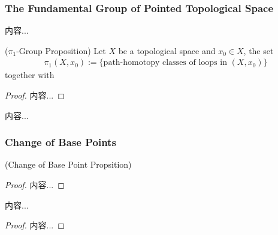 \documentclass[Total.tex]{subfiles}
\begin{document}
				\subsubsection{The Fundamental Group of Pointed Topological Space}
					\begin{Def}
						内容...
					\end{Def}
					\begin{proposition}
						($\pi_1$-Group Proposition) Let $X$ be a topological space and $x_0\in X$, the set
						\begin{gather*}
							\pi_1(X,x_0):=\{\mbox{path-homotopy classes of loops in }(X,x_0)\}
						\end{gather*}
						together with
					\end{proposition}
					\begin{proof}
						内容...
					\end{proof}
					
					\begin{Def}
						内容...
					\end{Def}
				\subsubsection{Change of Base Points}	
					\begin{proposition}
						(Change of Base Point Propsition)
					\end{proposition}
					\begin{proof}
						内容...
					\end{proof}
					
					\begin{corollary}
						内容...
					\end{corollary}
					\begin{proof}
						内容...
					\end{proof}
\end{document}

